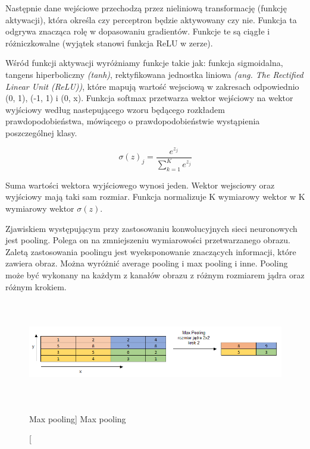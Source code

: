 \documentclass[a4paper,12pt]{article}
\begin{document}
			Następnie dane wejściowe przechodzą przez nieliniową transformację (funkcję aktywacji), która określa czy perceptron będzie aktywowany czy nie. 
			Funkcja ta odgrywa znacząca rolę w dopasowaniu gradientów. Funkcje te są ciągłe i różniczkowalne (wyjątek stanowi funkcja ReLU w zerze).
        
			Wśród funkcji aktywacji wyróżniamy funkcje takie jak: funkcja sigmoidalna,  tangens hiperboliczny \textit{(tanh)}, rektyfikowana jednostka liniowa 
			\textit{(ang. The Rectified Linear Unit (ReLU))}, które mapują wartość wejsciową w zakresach odpowiednio (0, 1), (-1, 1) i (0, x). 
			Funkcja softmax przetwarza wektor wejściowy na wektor wyjściowy według nastepującego wzoru będącego rozkładem prawdopodobieństwa, 
			mówiącego o prawdopodobieństwie wystąpienia poszczególnej klasy. 
        
			\begin{displaymath}
				\sigma (z)_{j} = \frac{e^{z_{j}}}{ \sum_{k=1}^K e^{z_{j}}}
			\end{displaymath}

			Suma wartości wektora wyjściowego wynosi jeden. Wektor wejsciowy oraz wyjściowy mają taki sam rozmiar. Funkcja normalizuje K wymiarowy wektor w K wymiarowy wektor  
			$ \sigma (z)$. 
        
	    \par Zjawiskiem występującym przy zastosowaniu konwolucyjnych sieci neuronowych jest pooling. Polega on na zmniejszeniu wymiarowości 
			przetwarzanego obrazu. Zaletą zastosowania poolingu jest wyeksponowanie znaczących informacji, które zawiera obraz. Można wyróżnić average 
			pooling i max pooling i inne. Pooling może być wykonany na każdym z kanałów obrazu z różnym rozmiarem jądra oraz różnym krokiem. 
	 
			\begin{figure}[!ht]
				\centering
				\includegraphics[width=17cm, height=4.5cm]{image//maxPoolingImg.png}
				\caption
				[Max pooling]
				{Max pooling}
			\end{figure}
        
\end{document}
